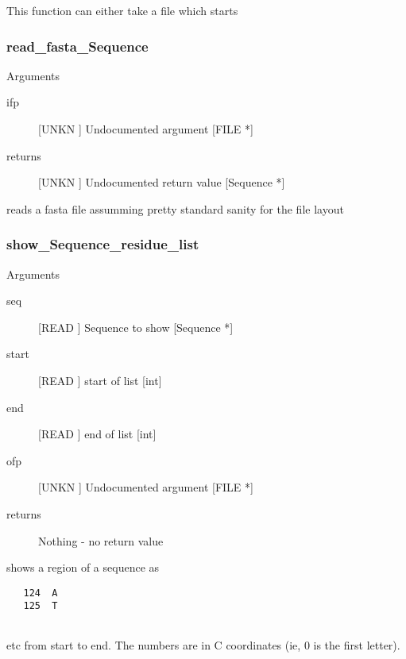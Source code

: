 This function can either take a file which 
starts




\subsubsection{read_fasta_Sequence}

Arguments
\begin{description}
\item[ifp] [UNKN ] Undocumented argument [FILE *]
\item[returns] [UNKN ] Undocumented return value [Sequence *]
\end{description}
reads a fasta file assumming pretty 
standard sanity for the file layout


\subsubsection{show_Sequence_residue_list}

Arguments
\begin{description}
\item[seq] [READ ] Sequence to show [Sequence *]
\item[start] [READ ] start of list [int]
\item[end] [READ ] end of list [int]
\item[ofp] [UNKN ] Undocumented argument [FILE *]
\item[returns] Nothing - no return value
\end{description}
shows a region of a sequence as
\begin{verbatim}
   124  A
   125  T


\end{verbatim}
etc from start to end. The numbers
are in C coordinates (ie, 0 is the first
letter).



